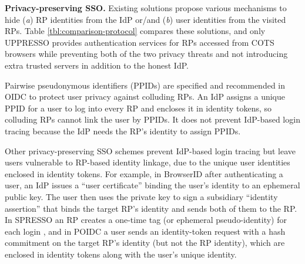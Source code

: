 \noindent\textbf{Privacy-preserving SSO.}
Existing solutions propose various mechanisms to hide (\emph{a}) RP identities from the IdP or/and (\emph{b}) user identities from the visited RPs.
Table \ref{tbl:comparison-protocol} compares these solutions,
and only UPPRESSO provides authentication services for RPs accessed from COTS browsers while preventing both of the two privacy threats and not introducing extra trusted servers in addition to the honest IdP.


Pairwise pseudonymous identifiers (PPIDs) are specified \cite{OpenIDConnect, SAMLIdentifier} and recommended \cite{NIST2017draft} in OIDC to protect user privacy against colluding RPs.
An IdP assigns a unique PPID for a user to log into every RP and encloses it in identity tokens, so colluding RPs cannot link the user by PPIDs.
It does not prevent IdP-based login tracing because the IdP needs the RP's identity to assign PPIDs.

Other privacy-preserving SSO schemes prevent IdP-based login tracing but leave users vulnerable to RP-based identity linkage, due to the unique user identities enclosed in identity tokens.
For example, in BrowserID \cite{BrowserID} 
after authenticating a user,
    an IdP %
issues a ``user certificate'' binding the user's identity to an ephemeral public key.
The user then uses the private key to sign a subsidiary ``identity assertion'' that binds the target RP's identity and sends both of them to the RP.
In SPRESSO an RP creates a one-time tag (or ephemeral pseudo-identity) for each login \cite{SPRESSO},
 and in POIDC \cite{POIDC,save-flow} a user sends an identity-token request with a hash commitment on the target RP's identity (but not the RP identity),
        which are enclosed in identity tokens along with the user's unique identity.



